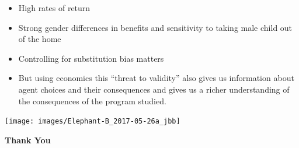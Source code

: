 \documentclass[static]{JJH-Beamer}
\begin{document}
\begin{frame}

\begin{itemize}
\item High rates of return
\item Strong gender differences in benefits and sensitivity to taking male child out of the home
\item Controlling for substitution bias matters
\item But using economics this ``threat to validity'' also gives us information about agent choices and their consequences and gives us a richer understanding of the consequences of the program studied.
\end{itemize}

\end{frame}

\begin{frame}

\begin{center}
\texttt{[image: images/Elephant-B\_2017-05-26a\_jbb]}\\
\end{center}

\end{frame}

\clearpage

\begingroup
\renewcommand{\insertframenumber}{}
\begin{frame}
 \addtocounter{framenumber}{-1}
\begin{center}
\textbf{Thank You}
\end{center}

\end{frame}
\end{document}
